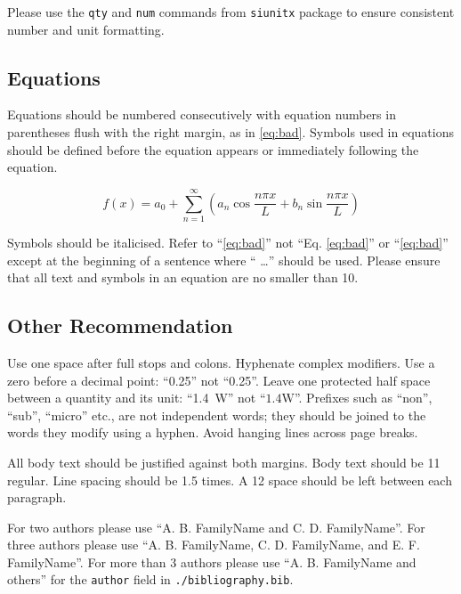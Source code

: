 \documentclass[a4paper,11pt]{article}
\begin{document}
Please use the \texttt{qty} and \texttt{num} commands from \texttt{siunitx}
package to ensure consistent number and unit formatting. 

\subsection{Equations}

Equations should be numbered consecutively with equation numbers in parentheses
flush with the right margin, as in \eqref{eq:bad}. Symbols used in equations
should be defined before the equation appears or immediately following the
equation. 

\begin{equation}\label{eq:bad}
  f(x) = a_{0} + \sum_{n = 1}^{\infty} \left( a_{n} \cos \frac{n\pi x}{L} + b_{n} \sin \frac{n\pi x}{L}\right)
\end{equation}

Symbols should be italicised. Refer to ``\eqref{eq:bad}'' not
``Eq. \eqref{eq:bad}'' or ``\cref{eq:bad}'' except at the beginning of 
a sentence where `` \dots'' should be used. Please ensure that all
text and symbols in an equation are no smaller than \qty{10}{\point}.

\subsection{Other Recommendation}

Use one space after full stops and colons. Hyphenate complex modifiers. Use a
zero before a decimal point: ``\num{0.25}'' not
``\num[print-zero-integer=false]{0.25}''. Leave one protected half space between
a quantity and its unit: ``\qty{1.4}{\watt}'' not ``$1.4\mathrm{W}$''. Prefixes 
such as ``non'', ``sub'', ``micro'' etc., are not independent words; they
should be joined to the words they modify using a hyphen. Avoid hanging lines
across page breaks. 

\begin{acknowledgment}
All body text should be justified against both margins. Body text should be
\qty{11}{\point} regular. Line spacing should be \num{1.5} times. A
\qty{12}{\point} space should be left between each paragraph.
\end{acknowledgment}

\begingroup
  
  
\endgroup

For two authors please use ``A. B. FamilyName and C. D. FamilyName''. For three
authors please use ``A. B. FamilyName, C. D. FamilyName, and E. F.
FamilyName''. For more than \num{3} authors please use ``A. B. FamilyName and
others'' for the \texttt{author} field in \texttt{./bibliography.bib}. 
\end{document}
